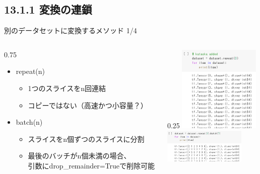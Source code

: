 \documentclass[aspectratio=169, dvipdfmx, 14pt, xcolor={svgnames,dvipsnames}, t]{beamer}
\newlength{\mytotalwidth}
\newlength{\mycolumnwidth}
\begin{document}
\hypertarget{ux5909ux63dbux306eux9023ux9396}{%
  \subsection{13.1.1 変換の連鎖}\label{ux5909ux63dbux306eux9023ux9396}}


\begin{frame}{別のデータセットに変換するメソッド 1/4}\label{ux5225ux306eux30c7ux30fcux30bfux30bbux30c3ux30c8ux306bux5909ux63dbux3059ux308bux30e1ux30bdux30c3ux30c9-14}

  \begin{columns}[totalwidth=\mytotalwidth]
    \begin{column}[t]{0.75\mycolumnwidth}
      \begin{itemize}
        \tightlist
        \item
              repeat(n)

              \begin{itemize}
                \tightlist
                \item
                      \alert{1つのスライスをn回連結}
                \item
                      コピーではない（高速かつ小容量？）
              \end{itemize}
        \item
              batch(n)

              \begin{itemize}
                \tightlist
                \item
                      スライスを\alert{n個ずつのスライスに分割}
                \item
                      最後のバッチがn個未満の場合、\\
                      引数にdrop\_remainder=Trueで削除可能
              \end{itemize}
      \end{itemize}
    \end{column}

    \begin{column}[T]{0.25\mycolumnwidth}
      \includegraphics[width=110pt]{img/hands-on-ml_13-1-1_1.png}
      \\
      \includegraphics[width=110pt]{img/hands-on-ml_13-1-1_2.png}
    \end{column}
  \end{columns}

\end{frame}
\end{document}
